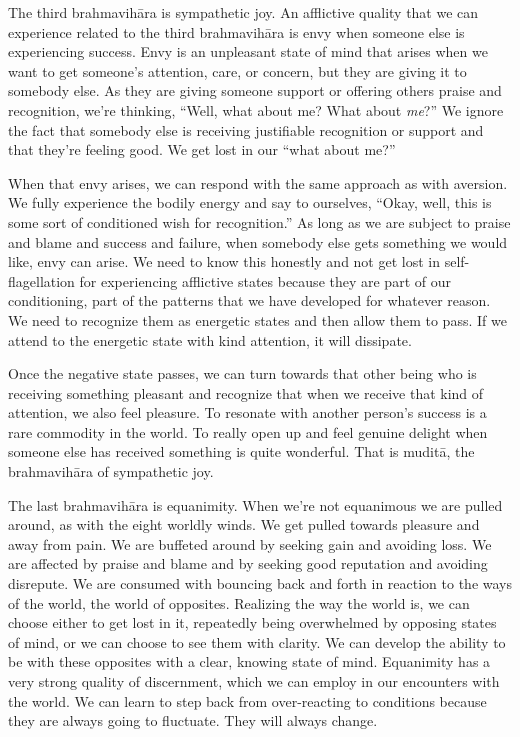 The third brahmavihāra is sympathetic joy. An afflictive quality that we can experience related to the third brahmavihāra is envy when someone else is experiencing success. Envy is an unpleasant state of mind that arises when we want to get someone's attention, care, or concern, but they are giving it to somebody else. As they are giving someone support or offering others praise and recognition, we're thinking, ``Well, what about me? What about \emph{me}?'' We ignore the fact that somebody else is receiving justifiable recognition or support and that they're feeling good. We get lost in our ``what about me?''

When that envy arises, we can respond with the same approach as with aversion. We fully experience the bodily energy and say to ourselves, ``Okay, well, this is some sort of conditioned wish for recognition.'' As long as we are subject to praise and blame and success and failure, when somebody else gets something we would like, envy can arise. We need to know this honestly and not get lost in self-flagellation for experiencing afflictive states because they are part of our conditioning, part of the patterns that we have developed for whatever reason. We need to recognize them as energetic states and then allow them to pass. If we attend to the energetic state with kind attention, it will dissipate.

Once the negative state passes, we can turn towards that other being who is receiving something pleasant and recognize that when we receive that kind of attention, we also feel pleasure. To resonate with another person's success is a rare commodity in the world. To really open up and feel genuine delight when someone else has received something is quite wonderful. That is muditā, the brahmavihāra of sympathetic joy.

The last brahmavihāra is equanimity. When we're not equanimous we are pulled around, as with the eight worldly winds. We get pulled towards pleasure and away from pain. We are buffeted around by seeking gain and avoiding loss. We are affected by praise and blame and by seeking good reputation and avoiding disrepute. We are consumed with bouncing back and forth in reaction to the ways of the world, the world of opposites. Realizing the way the world is, we can choose either to get lost in it, repeatedly being overwhelmed by opposing states of mind, or we can choose to see them with clarity. We can develop the ability to be with these opposites with a clear, knowing state of mind. Equanimity has a very strong quality of discernment, which we can employ in our encounters with the world. We can learn to step back from over-reacting to conditions because they are always going to fluctuate. They will always change.

